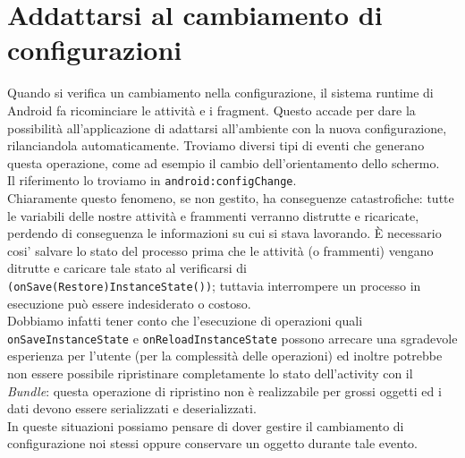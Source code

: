%

% 


\chapter{Addattarsi al cambiamento di configurazioni}
Quando si verifica un cambiamento nella configurazione, il sistema runtime di
Android fa ricominciare le attività e i fragment. Questo accade per dare la
possibilità all'applicazione di adattarsi all'ambiente con la nuova
configurazione, rilanciandola automaticamente. Troviamo diversi tipi di eventi
che generano questa operazione, come ad esempio il cambio dell'orientamento
dello schermo.\\
Il riferimento lo troviamo in \texttt{android:configChange}.\\
Chiaramente questo fenomeno, se non gestito, ha conseguenze catastrofiche: tutte
le variabili delle nostre attività e frammenti verranno distrutte e ricaricate,
perdendo di conseguenza le informazioni su cui si stava lavorando. È necessario
cosi' salvare lo stato del processo prima che le attività (o frammenti) vengano
ditrutte e caricare tale stato al verificarsi di
\texttt{(onSave(Restore)InstanceState())}; tuttavia interrompere un processo in
esecuzione può essere indesiderato o costoso.\\
Dobbiamo infatti tener conto che l'esecuzione di operazioni quali
\texttt{onSaveInstanceState} e \texttt{onReloadInstanceState} possono arrecare
una sgradevole esperienza per l'utente (per la complessità delle operazioni) ed
inoltre potrebbe non essere possibile ripristinare completamente lo stato
dell'activity con il \textit{Bundle}: questa operazione di ripristino non è
realizzabile per grossi oggetti ed i dati devono essere serializzati e
deserializzati.\\
In queste situazioni possiamo pensare di dover gestire il cambiamento di
configurazione noi stessi oppure conservare un oggetto durante tale evento.
